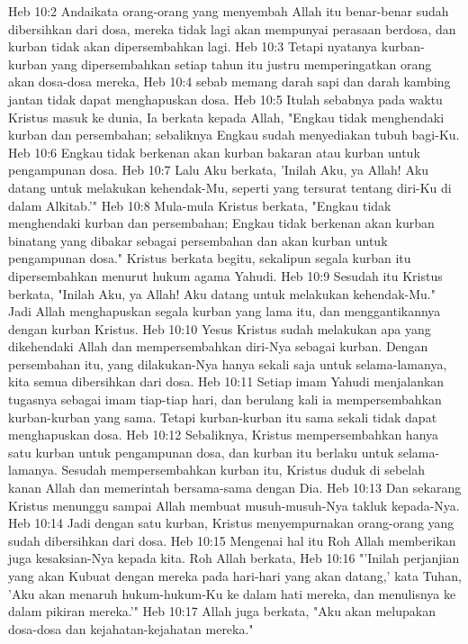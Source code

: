 Heb 10:2  Andaikata orang-orang yang menyembah Allah itu benar-benar sudah dibersihkan dari dosa, mereka tidak lagi akan mempunyai perasaan berdosa, dan kurban tidak akan dipersembahkan lagi.
Heb 10:3  Tetapi nyatanya kurban-kurban yang dipersembahkan setiap tahun itu justru memperingatkan orang akan dosa-dosa mereka,
Heb 10:4  sebab memang darah sapi dan darah kambing jantan tidak dapat menghapuskan dosa.
Heb 10:5  Itulah sebabnya pada waktu Kristus masuk ke dunia, Ia berkata kepada Allah, "Engkau tidak menghendaki kurban dan persembahan; sebaliknya Engkau sudah menyediakan tubuh bagi-Ku.
Heb 10:6  Engkau tidak berkenan akan kurban bakaran atau kurban untuk pengampunan dosa.
Heb 10:7  Lalu Aku berkata, 'Inilah Aku, ya Allah! Aku datang untuk melakukan kehendak-Mu, seperti yang tersurat tentang diri-Ku di dalam Alkitab.'"
Heb 10:8  Mula-mula Kristus berkata, "Engkau tidak menghendaki kurban dan persembahan; Engkau tidak berkenan akan kurban binatang yang dibakar sebagai persembahan dan akan kurban untuk pengampunan dosa." Kristus berkata begitu, sekalipun segala kurban itu dipersembahkan menurut hukum agama Yahudi.
Heb 10:9  Sesudah itu Kristus berkata, "Inilah Aku, ya Allah! Aku datang untuk melakukan kehendak-Mu." Jadi Allah menghapuskan segala kurban yang lama itu, dan menggantikannya dengan kurban Kristus.
Heb 10:10  Yesus Kristus sudah melakukan apa yang dikehendaki Allah dan mempersembahkan diri-Nya sebagai kurban. Dengan persembahan itu, yang dilakukan-Nya hanya sekali saja untuk selama-lamanya, kita semua dibersihkan dari dosa.
Heb 10:11  Setiap imam Yahudi menjalankan tugasnya sebagai imam tiap-tiap hari, dan berulang kali ia mempersembahkan kurban-kurban yang sama. Tetapi kurban-kurban itu sama sekali tidak dapat menghapuskan dosa.
Heb 10:12  Sebaliknya, Kristus mempersembahkan hanya satu kurban untuk pengampunan dosa, dan kurban itu berlaku untuk selama-lamanya. Sesudah mempersembahkan kurban itu, Kristus duduk di sebelah kanan Allah dan memerintah bersama-sama dengan Dia.
Heb 10:13  Dan sekarang Kristus menunggu sampai Allah membuat musuh-musuh-Nya takluk kepada-Nya.
Heb 10:14  Jadi dengan satu kurban, Kristus menyempurnakan orang-orang yang sudah dibersihkan dari dosa.
Heb 10:15  Mengenai hal itu Roh Allah memberikan juga kesaksian-Nya kepada kita. Roh Allah berkata,
Heb 10:16  "'Inilah perjanjian yang akan Kubuat dengan mereka pada hari-hari yang akan datang,' kata Tuhan, 'Aku akan menaruh hukum-hukum-Ku ke dalam hati mereka, dan menulisnya ke dalam pikiran mereka.'"
Heb 10:17  Allah juga berkata, "Aku akan melupakan dosa-dosa dan kejahatan-kejahatan mereka."

